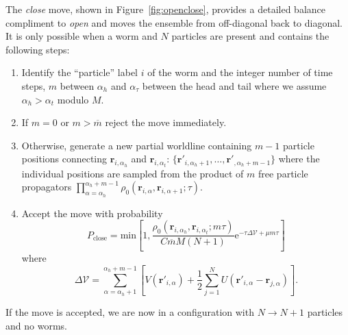 \documentclass[prb,aps,amssym,nofootinbib,floatfix,notitlepage]{revtex4-1}
\renewcommand{\vec}[1]{\boldsymbol{#1}}
\newcommand{\e}[1]{\mathrm{e}^{#1}}
\begin{document}
\noindent
The \emph{close} move, shown in Figure~\ref{fig:openclose}, provides a detailed balance compliment to \emph{open} and
moves the ensemble from off-diagonal back to diagonal. It is only possible when
a worm and $N$ particles are present and contains the following steps:
\begin{enumerate}
    \item Identify the ``particle'' label $i$ of the worm and the integer number of time steps, $m$ between $\alpha_h$ and
        $\alpha_\tau$ between the head and tail where we assume $\alpha_h > \alpha_t$ modulo $M$.
\item If $m=0$ or $m> \overline{m}$ reject the move immediately.
\item Otherwise, generate a new partial worldline containing $m-1$ particle positions connecting 
    $\vec{r}_{i,\alpha_h}$ and $\vec{r}_{i,\alpha_t}$: $\{\vec{r}'_{i,\alpha_h+1},\ldots,
    \vec{r}'_{,\alpha_h+m-1}\}$ where the individual positions are sampled from
    the product of $m$ free particle propagators
    $\prod_{\alpha=\alpha_h}^{\alpha_h+m-1}
    \rho_0(\vec{r}_{i,\alpha},\vec{r}_{i,\alpha+1};\tau)$.
\item Accept the move with probability
\begin{equation}
    P_{\text{close}} = \mathrm{min} \left[1,
        \frac{\rho_0(\vec{r}_{i,\alpha_h},\vec{r}_{i,\alpha_t}; m \tau)}{C
    \overline{m}M (N+1)} \e{-\tau \Delta \mathcal{V} + \mu m \tau} \right]
\end{equation}
%
where
%
\begin{equation}
    \Delta\mathcal{V} = \sum_{\alpha=\alpha_h+1}^{\alpha_h+m-1} \left[ 
        V(\vec{r}'_{i,\alpha}) + \frac{1}{2}\sum_{j=1}^N
        U(\vec{r}'_{i,\alpha}-\vec{r}_{j,\alpha}) \right].
\end{equation}
%
\end{enumerate}
If the move is accepted, we are now in a configuration with $N \to N+1$
particles and no worms.
\end{document}
